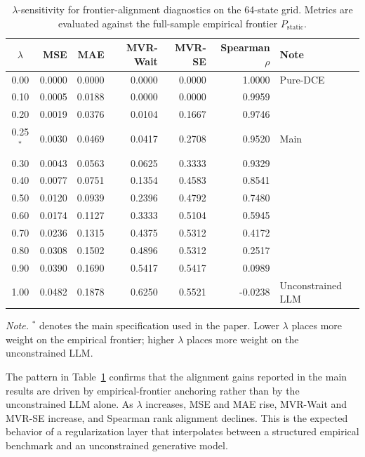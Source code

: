 \documentclass[11pt]{article}
\begin{document}
\begin{table}[htbp]
\centering
\caption{\(\lambda\)-sensitivity for frontier-alignment diagnostics on the 64-state grid. Metrics are evaluated against the full-sample empirical frontier \(P_{\mathrm{static}}\).}
\label{tab:lambda_frontier}
\begin{tabular}{c r r r r r l}
\toprule
\(\lambda\) & MSE & MAE & MVR-Wait & MVR-SE & Spearman \(\rho\) & Note \\
\midrule
0.00 & 0.0000 & 0.0000 & 0.0000 & 0.0000 & 1.0000 & Pure-DCE \\
0.10 & 0.0005 & 0.0188 & 0.0000 & 0.0000 & 0.9959 &  \\
0.20 & 0.0019 & 0.0376 & 0.0104 & 0.1667 & 0.9746 &  \\
0.25\(^*\) & 0.0030 & 0.0469 & 0.0417 & 0.2708 & 0.9520 & Main \\
0.30 & 0.0043 & 0.0563 & 0.0625 & 0.3333 & 0.9329 &  \\
0.40 & 0.0077 & 0.0751 & 0.1354 & 0.4583 & 0.8541 &  \\
0.50 & 0.0120 & 0.0939 & 0.2396 & 0.4792 & 0.7480 &  \\
0.60 & 0.0174 & 0.1127 & 0.3333 & 0.5104 & 0.5945 &  \\
0.70 & 0.0236 & 0.1315 & 0.4375 & 0.5312 & 0.4172 &  \\
0.80 & 0.0308 & 0.1502 & 0.4896 & 0.5312 & 0.2517 &  \\
0.90 & 0.0390 & 0.1690 & 0.5417 & 0.5417 & 0.0989 &  \\
1.00 & 0.0482 & 0.1878 & 0.6250 & 0.5521 & -0.0238 & Unconstrained LLM \\
\bottomrule
\end{tabular}

\vspace{0.3em}
\begin{minipage}{0.92\textwidth}
\small
\textit{Note.} \(^*\) denotes the main specification used in the paper. Lower \(\lambda\) places more weight on the empirical frontier; higher \(\lambda\) places more weight on the unconstrained LLM.
\end{minipage}
\end{table}

The pattern in Table~\ref{tab:lambda_frontier} confirms that the alignment gains reported in the main results are driven by empirical-frontier anchoring rather than by the unconstrained LLM alone. As \(\lambda\) increases, MSE and MAE rise, MVR-Wait and MVR-SE increase, and Spearman rank alignment declines. This is the expected behavior of a regularization layer that interpolates between a structured empirical benchmark and an unconstrained generative model.
\end{document}
